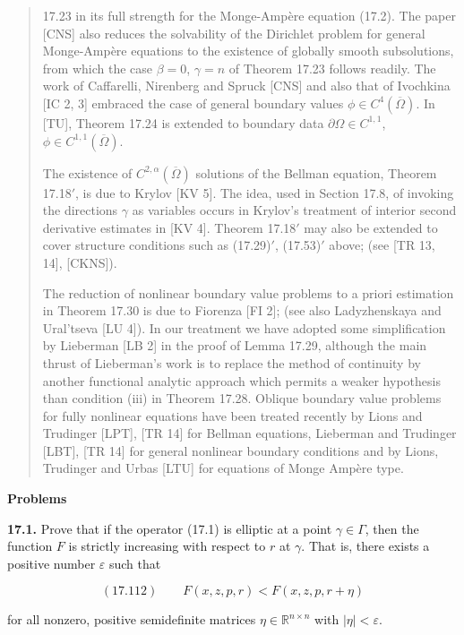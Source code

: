 \begin{quote}
17.23 in its full strength for the Monge-Amp\`ere equation (17.2). The paper [CNS]
also reduces the solvability of the Dirichlet problem for general Monge-Amp\`ere
equations to the existence of globally smooth subsolutions, from which the case
$\beta = 0$, $\gamma = n$ of Theorem 17.23 follows readily. The work of Caffarelli, Nirenberg
and Spruck [CNS] and also that of Ivochkina [IC 2, 3] embraced the case of
general boundary values $\phi \in C^{4}(\overline{\Omega})$. In [TU], Theorem 17.24 is extended to
boundary data $\partial \Omega \in C^{1,1}$, $\phi \in C^{1,1}(\overline{\Omega})$.

The existence of $C^{2,\alpha}(\overline{\Omega})$ solutions of the Bellman equation, Theorem 17.18$'$, is
due to Krylov [KV 5]. The idea, used in Section 17.8, of invoking the directions
$\gamma$ as variables occurs in Krylov's treatment of interior second derivative estimates
in [KV 4]. Theorem 17.18$'$ may also be extended to cover structure conditions
such as (17.29)$'$, (17.53)$'$ above; (see [TR 13, 14], [CKNS]).

The reduction of nonlinear boundary value problems to a priori estimation in
Theorem 17.30 is due to Fiorenza [FI 2]; (see also Ladyzhenskaya and Ural'tseva
[LU 4]). In our treatment we have adopted some simplification by Lieberman
[LB 2] in the proof of Lemma 17.29, although the main thrust of Lieberman's work
is to replace the method of continuity by another functional analytic approach
which permits a weaker hypothesis than condition (iii) in Theorem 17.28. Oblique
boundary value problems for fully nonlinear equations have been treated recently
by Lions and Trudinger [LPT], [TR 14] for Bellman equations, Lieberman and
Trudinger [LBT], [TR 14] for general nonlinear boundary conditions and by Lions,
Trudinger and Urbas [LTU] for equations of Monge Amp\`ere type.
\end{quote}

\bigskip

\noindent\textbf{Problems}

\medskip

\noindent\textbf{17.1.} \quad Prove that if the operator (17.1) is elliptic at a point $\gamma \in \Gamma$, then the function
$F$ is strictly increasing with respect to $r$ at $\gamma$. That is, there exists a positive number
$\varepsilon$ such that

\[
(17.112)\qquad F(x,z,p,r) < F(x,z,p,r+\eta)
\]

\noindent for all nonzero, positive semidefinite matrices $\eta \in \mathbb{R}^{n\times n}$ with $|\eta|<\varepsilon$.

